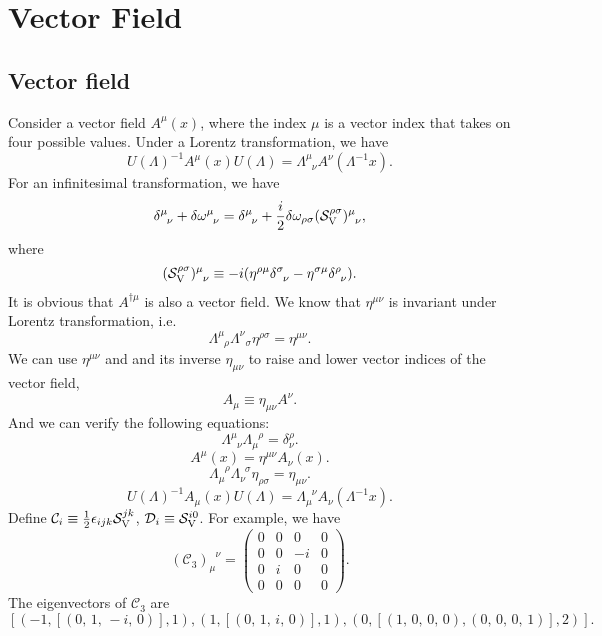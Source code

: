 \chapter{Vector Field}
\section{Vector field}
Consider a vector field $A^{\mu}(x)$, where the index $\mu$ is a vector index that takes on four possible values. 
Under a Lorentz transformation, we have
\[U(\Lambda)^{-1} A^{\mu}(x) U(\Lambda) = \Lambda^{\mu}_{\phantom{\mu}\nu} A^{\nu}(\Lambda^{-1}x).\]
For an infinitesimal transformation, we have
\[\delta^{\mu}_{\phantom{\mu}\nu}+\delta \omega ^{\mu}_{\phantom{\mu}\nu} = \delta^{\mu}_{\phantom{\mu}\nu} + \frac{i}{2} \delta \omega_{\rho \sigma} (\mathcal{S}_{\rm V}^{\rho \sigma})^{\mu}_{\phantom{\mu}\nu},\]
where
\[(\mathcal{S}_{\rm V}^{\rho \sigma})^{\mu}_{\phantom{\mu}\nu} \equiv -i(\eta^{\rho \mu}\delta ^{\sigma}_{\phantom{\sigma}\nu} - \eta^{\sigma \mu}\delta^{\rho}_{\phantom{\rho}\nu}).\]
It is obvious that $A^{\dagger \mu}$ is also a vector field. 
We know that $\eta^{\mu \nu}$ is invariant under Lorentz transformation, i.e.
\[\Lambda^{\mu}_{\phantom{\mu}\rho} \Lambda^{\nu}_{\phantom{\mu}\sigma} \eta^{\rho \sigma} = \eta^{\mu \nu} .\]
We can use $\eta^{\mu \nu}$ and and its inverse $\eta_{\mu\nu}$ to raise and lower vector indices of the vector field,
\[A_{\mu} \equiv \eta_{\mu \nu} A^{\nu}.\]
And we can verify the following equations:
\[\Lambda^{\mu}_{\phantom{\mu}\nu} \Lambda_{\mu}^{\phantom{\mu}\rho} = \delta^{\rho}_{\nu} .\]
\[A^{\mu}(x) = \eta^{\mu \nu} A_{\nu}(x).\]
\[\Lambda_{\mu}^{\phantom{\mu}\rho} \Lambda_{\nu}^{\phantom{\nu}\sigma} \eta_{\rho \sigma} = \eta_{\mu \nu}.\]
\[U(\Lambda)^{-1} A_{\mu}(x) U(\Lambda) = \Lambda_{\mu}^{\phantom{\mu}\nu} A_{\nu}(\Lambda^{-1}x).\]
Define $\mathcal{C}_i \equiv \frac{1}{2}\epsilon_{ijk}\mathcal{S}_{\rm V}^{jk}$, $\mathcal{D}_i \equiv \mathcal{S}_{\rm V}^{i0}$. 
For example, we have
\[(\mathcal{C}_3)_{\mu}^{\phantom{\mu}\nu} = \left(\begin{array}{rrrr}
0 & 0 & 0 & 0 \\
0 & 0 & -i & 0 \\
0 & i & 0 & 0 \\
0 & 0 & 0 & 0
\end{array}\right).\]
The eigenvectors of $\mathcal{C}_3$ are
\[\left[\left(-1, \left[\left(0,\,1,\,-i,\,0\right)\right], 1\right),
\left(1, \left[\left(0,\,1,\,i,\,0\right)\right], 1\right), \left(0,
\left[\left(1,\,0,\,0,\,0\right), \left(0,\,0,\,0,\,1\right)\right],
2\right)\right].\]
